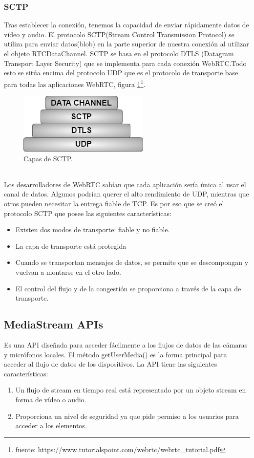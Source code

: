 \subsubsection*{SCTP}
Tras establecer la conexión, tenemos la capacidad de enviar rápidamente datos de vídeo y audio. El protocolo SCTP(Stream Control Transmission Protocol) se utiliza para enviar datos(blob) en la parte superior de nuestra conexión al utilizar el objeto RTCDataChannel. SCTP se basa en el protocolo DTLS (Datagram Transport Layer Security) que se implementa para cada conexión WebRTC.Todo esto se sitúa encima del protocolo UDP que es el protocolo de transporte base para todas las aplicaciones WebRTC, figura \ref{fig:SCTP_Example}\footnote{fuente: https://www.tutorialspoint.com/webrtc/webrtc\_tutorial.pdf}.
\begin{figure}[!h]
\begin{center}
   \includegraphics[width=0.4\linewidth]{Figures/SCTP_Example}
	\decoRule
	\caption[Capas de SCTP]{Capas de SCTP.}
\label{fig:SCTP_Example}
\end{center}
\end{figure}
\\Los desarrolladores de WebRTC sabían que cada aplicación sería única al usar el canal de datos. Algunos podrían querer el alto rendimiento de UDP, mientras que otros pueden necesitar la entrega fiable de TCP. Es por eso que se creó el protocolo SCTP que posee las siguientes características:
\begin{itemize}
\item Existen dos modos de transporte: fiable y no fiable.
\item La capa de transporte está protegida
\item Cuando se transportan mensajes de datos, se permite que se descompongan y vuelvan a montarse en el otro lado.
\item El control del flujo y de la congestión se proporciona a través de la capa de transporte.
\end{itemize}
\subsection{MediaStream APIs}
Es una API diseñada para acceder fácilmente a los flujos de datos de las cámaras y micrófonos locales. El método getUserMedia() es la forma principal para acceder al flujo de datos de los dispositivos.
La API tiene las siguientes características:
\begin{enumerate}
\item Un flujo de stream en tiempo real está representado por un objeto stream en forma de vídeo o audio.
\item Proporciona un nivel de seguridad ya que pide permiso a los usuarios para acceder a los elementos.
\end{enumerate}
